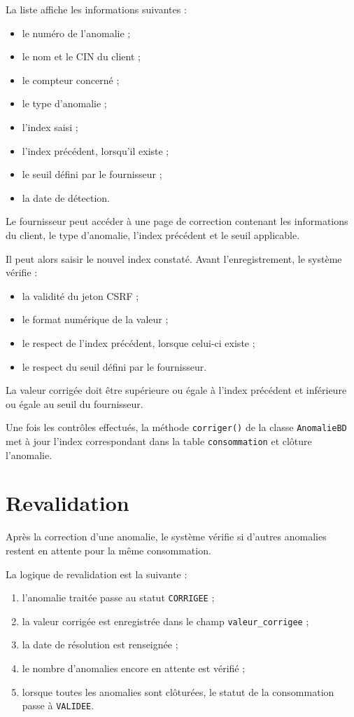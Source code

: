 La liste affiche les informations suivantes :
\begin{itemize}
    \item le numéro de l'anomalie ;
    \item le nom et le CIN du client ;
    \item le compteur concerné ;
    \item le type d'anomalie ;
    \item l'index saisi ;
    \item l'index précédent, lorsqu'il existe ;
    \item le seuil défini par le fournisseur ;
    \item la date de détection.
\end{itemize}

Le fournisseur peut accéder à une page de correction contenant les informations du client, le type d'anomalie, l'index précédent et le seuil applicable.

Il peut alors saisir le nouvel index constaté. Avant l'enregistrement, le système vérifie :
\begin{itemize}
    \item la validité du jeton CSRF ;
    \item le format numérique de la valeur ;
    \item le respect de l'index précédent, lorsque celui-ci existe ;
    \item le respect du seuil défini par le fournisseur.
\end{itemize}

La valeur corrigée doit être supérieure ou égale à l'index précédent et inférieure ou égale au seuil du fournisseur.

Une fois les contrôles effectués, la méthode \texttt{corriger()} de la classe \texttt{AnomalieBD} met à jour l'index correspondant dans la table \texttt{consommation} et clôture l'anomalie.

\section{Revalidation}

Après la correction d'une anomalie, le système vérifie si d'autres anomalies restent en attente pour la même consommation.

La logique de revalidation est la suivante :
\begin{enumerate}
    \item l'anomalie traitée passe au statut \texttt{CORRIGEE} ;
    \item la valeur corrigée est enregistrée dans le champ \texttt{valeur\_corrigee} ;
    \item la date de résolution est renseignée ;
    \item le nombre d'anomalies encore en attente est vérifié ;
    \item lorsque toutes les anomalies sont clôturées, le statut de la consommation passe à \texttt{VALIDEE}.
\end{enumerate}

